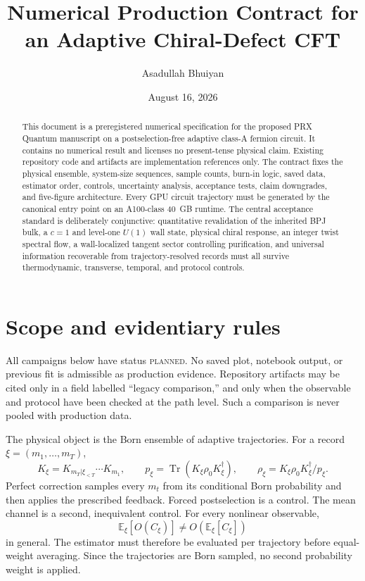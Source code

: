 \documentclass[aps,prx,onecolumn,nofootinbib,superscriptaddress,longbibliography]{revtex4-2}
\newcommand{\E}{\mathbb{E}}
\newcommand{\qTr}{\operatorname{Tr}}
\newcommand{\planned}{\textsc{planned}}
\begin{document}
\title{Numerical Production Contract for an Adaptive Chiral-Defect CFT}
\author{Asadullah Bhuiyan}
\date{August 16, 2026}

\begin{abstract}
This document is a preregistered numerical specification for the proposed PRX Quantum
manuscript on a postselection-free adaptive class-A fermion circuit.  It contains no
numerical result and licenses no present-tense physical claim.  Existing repository code
and artifacts are implementation references only.  The contract fixes the physical
ensemble, system-size sequences, sample counts, burn-in logic, saved data, estimator order,
controls, uncertainty analysis, acceptance tests, claim downgrades, and five-figure
architecture.  Every GPU circuit trajectory must be generated by the canonical
 entry point on an A100-class 40~GB
runtime.  The central acceptance standard is deliberately conjunctive: quantitative
revalidation of the inherited BPJ bulk, a $c=1$ and level-one $U(1)$ wall state, physical chiral response, an integer
twist spectral flow, a wall-localized tangent sector controlling purification, and
universal information recoverable from trajectory-resolved records must all survive thermodynamic,
transverse, temporal, and protocol controls.
\end{abstract}

\maketitle
\setcounter{tocdepth}{2}
\tableofcontents

\section{Scope and evidentiary rules}

All campaigns below have status \planned.  No saved plot, notebook output, or previous fit
is admissible as production evidence.  Repository artifacts may be cited only in a field
labelled ``legacy comparison,'' and only when the observable and protocol have been checked
at the path level.  Such a comparison is never pooled with production data.

The physical object is the Born ensemble of adaptive trajectories.  For a record
$\xi=(m_1,\ldots,m_T)$,
\begin{equation}
 K_\xi=K_{m_T|\xi_{<T}}\cdots K_{m_1},\qquad
 p_\xi=\qTr(K_\xi\rho_0K_\xi^\dagger),\qquad
 \rho_\xi=K_\xi\rho_0K_\xi^\dagger/p_\xi .
\end{equation}
Perfect correction samples every $m_t$ from its conditional Born probability and then
applies the prescribed feedback.  Forced postselection is a control.  The mean channel is
a second, inequivalent control.  For every nonlinear observable,
\begin{equation}
 \E_\xi[O(C_\xi)]\ne O(\E_\xi[C_\xi])
\end{equation}
in general.  The estimator must therefore be evaluated per trajectory before equal-weight
averaging.  Since the trajectories are Born sampled, no second probability weight is
applied.
\end{document}
